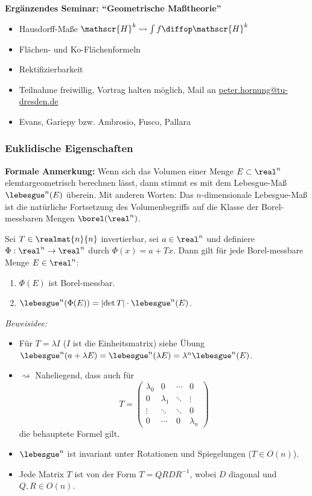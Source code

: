 \textbf{Ergänzendes Seminar: ``Geometrische Maßtheorie''}
\begin{itemize}
 \item Hausdorff-Maße $\mathscr{H}^k \rightsquigarrow \int f \diffop \mathscr{H}^k$
 \item Flächen- und Ko-Flächenformeln
 \item Rektifizierbarkeit
 \item Teilnahme freiwillig, Vortrag halten möglich, Mail an \href{mailto:peter.hornung@tu-dresden.de}{peter.hornung@tu-dresden.de}
 \item Evans, Gariepy bzw. Ambrosio, Fusco, Pallara
\end{itemize}

\subsubsection{Euklidische Eigenschaften}
\textbf{Formale Anmerkung:} Wenn sich das Volumen einer Menge $E \subset \real^n$ elemtargeometrisch berechnen lässt, dann stimmt es mit dem Lebesgue-Maß $\lebesgue^n(E)$ überein. Mit anderen Worten: Das $n$-dimensionale Lebesgue-Maß ist die natürliche Fortsetzung des Volumenbegriffs auf die Klasse der Borel-messbaren Mengen $\borel(\real^n)$.

\begin{thm}
 Sei $T \in \realmat{n}{n}$ invertierbar, sei $a \in \real^n$ und definiere $\Phi:\real^n \to \real^n$ durch $\Phi(x) = a + Tx$. Dann gilt für jede Borel-messbare Menge $E \in \real^n$:
 \begin{enumerate}
  \item $\Phi(E)$ ist Borel-messbar.
  \item $\lebesgue^n( \Phi(E) ) = | {\det T} | \cdot \lebesgue^n (E)$.
 \end{enumerate}
\end{thm}

\emph{Beweisidee:} 
\begin{itemize}
 \item Für $T = \lambda I$ ($I$ ist die Einheitsmatrix) siehe Übung $\lebesgue^n (a + \lambda E) = \lebesgue^n ( \lambda E ) = \lambda^n \lebesgue^n (E)$. 
 \item $\rightsquigarrow$ Naheliegend, dass auch für 
\[ T = \begin{pmatrix} 
        \lambda_0 & 0 & \cdots & 0\\
        0 & \lambda_1 & \ddots & \vdots\\
        \vdots  & \ddots & \ddots & 0 \\
        0  & \cdots & 0 & \lambda_n
       \end{pmatrix} \]
 die behauptete Formel gilt.
 \item $\lebesgue^n$ ist invariant unter Rotationen und Spiegelungen ($T \in O(n)$).
 \item Jede Matrix $T$ ist von der Form $T = QRDR^{-1}$, wobei $D$ diagonal und $Q,R \in O(n)$.
\end{itemize}

